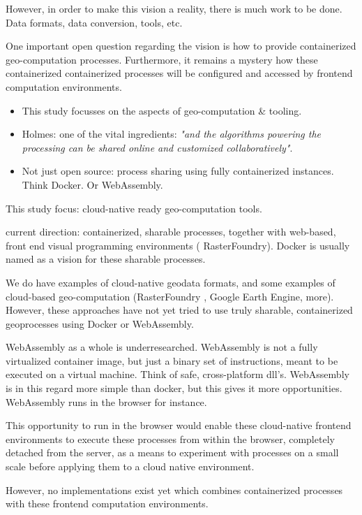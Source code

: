 \m{->} However, in order to make this vision a reality, there is much work to be done. Data formats, data conversion, tools, etc. 

One important open question regarding the vision is how to provide containerized geo-computation processes. Furthermore, it remains a mystery how these containerized containerized processes will be configured and accessed by frontend computation environments. 

\begin{itemize}
  \item This study focusses on the aspects of geo-computation \& tooling.
  \item Holmes: one of the vital ingredients: \emph{"and the algorithms powering the processing can be shared online and customized collaboratively"}.
  \item Not just open source: process sharing using fully containerized instances. Think Docker. Or WebAssembly.
\end{itemize}

\m{->} This study focus: cloud-native ready geo-computation tools. 

\m{->} current direction: containerized, sharable processes, together with web-based, front end visual programming environments ( RasterFoundry). Docker is usually named as a vision for these sharable processes.

\m{->} We do have examples of cloud-native geodata formats, and some examples of cloud-based geo-computation (RasterFoundry , Google Earth Engine, more). However, these approaches have not yet tried to use truly sharable, containerized geoprocesses using Docker or WebAssembly. 

\m{->} WebAssembly as a whole is underresearched. WebAssembly is not a fully virtualized container image, but just a binary set of instructions, meant to be executed on a virtual machine. Think of safe, cross-platform dll's. 
WebAssembly is in this regard more simple than docker, but this gives it more opportunities. 
WebAssembly runs in the browser for instance. 

\m{->} This opportunity to run in the browser would enable these cloud-native frontend environments to execute these processes from within the browser, completely detached from the server, as a means to experiment with processes on a small scale before applying them to a cloud native environment. 

\m{->} However, no implementations exist yet which combines containerized processes with these frontend computation environments. 

